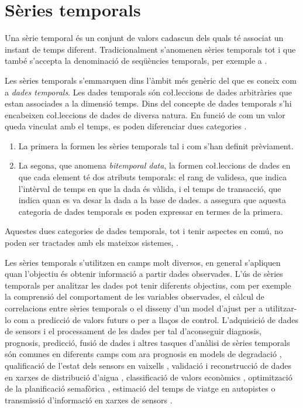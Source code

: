 \section{Sèries temporals}

Una sèrie temporal és un conjunt de valors cadascun dels quals té
associat un instant de temps diferent.  Tradicionalment s'anomenen
sèries temporals tot i que també s'accepta la denominació de
seqüències temporals, per exemple a \cite{last:hetland}.

Les sèries temporals s'emmarquen dins l'àmbit més genèric del que es
coneix com a \emph{dades temporals}. Les dades temporals són
co\l.leccions de dades arbitràries que estan associades a la dimensió
temps.  Dins del concepte de dades temporals s'hi encabeixen
co\l.leccions de dades de diversa natura. En funció de com un valor
queda vinculat amb el temps, es poden diferenciar dues
categories \parencite{assfalg08:thesis}.
\begin{enumerate}
\item La primera la formen les sèries temporals tal i com s'han
  definit prèviament. 
\item La segona, que anomena \emph{bitemporal data}, la formen
  co\l.leccions de dades en que cada element té dos atributs
  temporals: el rang de validesa, que indica l'intèrval de temps en
  que la dada és vàlida, i el temps de transacció, que indica quan es
  va desar la dada a la base de dades.  \citeauthor{assfalg08:thesis}
  a \cite{assfalg08:thesis} assegura que aquesta categoria de dades
  temporals es poden expressar en termes de la primera.
\end{enumerate}
Aquestes dues categories de dades temporals, tot i tenir aspectes en
comú, no poden ser tractades amb els mateixos
sistemes, \parencite{schmidt95}.


Les sèries temporals s'utilitzen en camps molt diversos, en general
s'apliquen quan l'objectiu és obtenir informació a partir dades
observades. L'ús de sèries temporals per analitzar les dades pot tenir
diferents objectius, com per exemple la comprensió del comportament de
les variables observades, el càlcul de correlacions entre sèries
temporals o el disseny d'un model d'ajust per a utilitzar-lo com a
predicció de valors futurs o per a llaços de control.  L'adquisició de
dades de sensors i el processament de les dades per tal d'aconseguir
diagnosis, prognosis, predicció, fusió de dades i altres tasques
d'anàlisi de sèries temporals són comunes en diferents camps com ara
prognosis en models de degradació \parencite{yu11}, qualificació de
l'estat dels sensors en vaixells \parencite{palmer07}, validació i
reconstrucció de dades en xarxes de distribució
d'aigua \parencite{quevedo10}, classificació de valors
econòmics \parencite{dreyer95}, optimització de la planificació
semafòrica \parencite{last11}, estimació del temps de viatge en
autopistes \parencite{soriguera10} o transmissió d'informació en
xarxes de sensors \parencite{jainagrawal05,yaogehrke02}.



